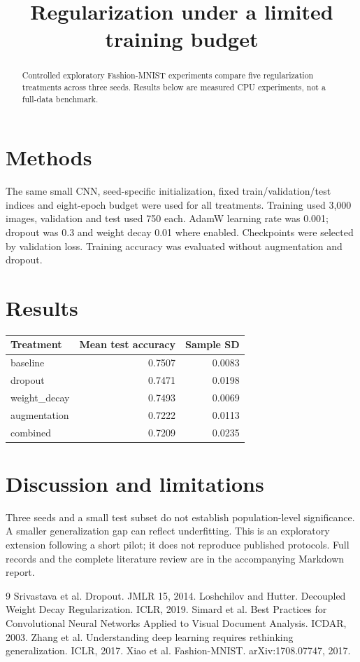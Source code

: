 \documentclass{article}
\title{Regularization under a limited training budget}
\date{}
\begin{document}
\maketitle
\begin{abstract}Controlled exploratory Fashion-MNIST experiments compare five regularization treatments across three seeds. Results below are measured CPU experiments, not a full-data benchmark.\end{abstract}
\section{Methods}The same small CNN, seed-specific initialization, fixed train/validation/test indices and eight-epoch budget were used for all treatments. Training used 3,000 images, validation and test used 750 each. AdamW learning rate was 0.001; dropout was 0.3 and weight decay 0.01 where enabled. Checkpoints were selected by validation loss. Training accuracy was evaluated without augmentation and dropout.
\section{Results}
\begin{tabular}{lrr}\toprule Treatment & Mean test accuracy & Sample SD \\\midrule
baseline & 0.7507 & 0.0083 \\
dropout & 0.7471 & 0.0198 \\
weight\_decay & 0.7493 & 0.0069 \\
augmentation & 0.7222 & 0.0113 \\
combined & 0.7209 & 0.0235 \\
\bottomrule\end{tabular}
\section{Discussion and limitations}Three seeds and a small test subset do not establish population-level significance. A smaller generalization gap can reflect underfitting. This is an exploratory extension following a short pilot; it does not reproduce published protocols. Full records and the complete literature review are in the accompanying Markdown report.
\begin{thebibliography}{9}
Srivastava et al. Dropout. JMLR 15, 2014.
Loshchilov and Hutter. Decoupled Weight Decay Regularization. ICLR, 2019.
Simard et al. Best Practices for Convolutional Neural Networks Applied to Visual Document Analysis. ICDAR, 2003.
Zhang et al. Understanding deep learning requires rethinking generalization. ICLR, 2017.
Xiao et al. Fashion-MNIST. arXiv:1708.07747, 2017.
\end{thebibliography}
\end{document}
